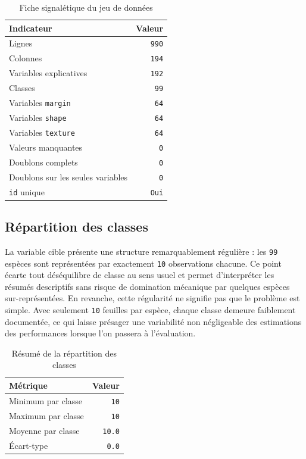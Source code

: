 \begin{table}[H]
\centering
\begin{tabular}{|l|r|}
\hline
\textbf{Indicateur} & \textbf{Valeur} \\
\hline
Lignes & \texttt{990} \\
Colonnes & \texttt{194} \\
Variables explicatives & \texttt{192} \\
Classes & \texttt{99} \\
Variables \texttt{margin} & \texttt{64} \\
Variables \texttt{shape} & \texttt{64} \\
Variables \texttt{texture} & \texttt{64} \\
Valeurs manquantes & \texttt{0} \\
Doublons complets & \texttt{0} \\
Doublons sur les seules variables & \texttt{0} \\
\texttt{id} unique & \texttt{Oui} \\
\hline
\end{tabular}
\caption{Fiche signalétique du jeu de données}
\end{table}

\subsection{Répartition des classes}
La variable cible présente une structure remarquablement régulière : les \texttt{99} espèces sont représentées par exactement \texttt{10} observations chacune. Ce point écarte tout déséquilibre de classe au sens usuel et permet d'interpréter les résumés descriptifs sans risque de domination mécanique par quelques espèces sur-représentées. En revanche, cette régularité ne signifie pas que le problème est simple. Avec seulement \texttt{10} feuilles par espèce, chaque classe demeure faiblement documentée, ce qui laisse présager une variabilité non négligeable des estimations des performances lorsque l'on passera à l'évaluation.

\begin{table}[H]
\centering
\begin{tabular}{|l|r|}
\hline
\textbf{Métrique} & \textbf{Valeur} \\
\hline
Minimum par classe & \texttt{10} \\
Maximum par classe & \texttt{10} \\
Moyenne par classe & \texttt{10.0} \\
Écart-type & \texttt{0.0} \\
\hline
\end{tabular}
\caption{Résumé de la répartition des classes}
\end{table}

